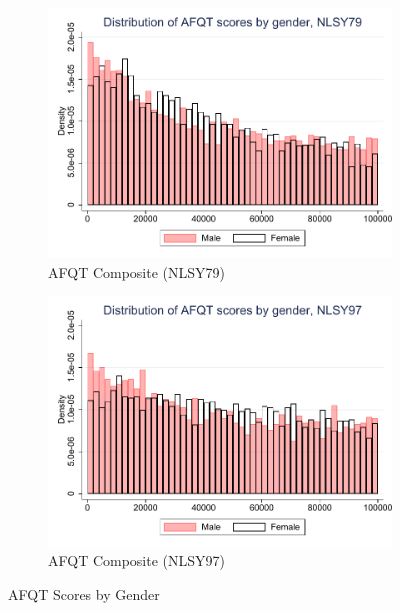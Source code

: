 \documentclass[onehalfspacing,11pt]{article}
\begin{document}
\begin{figure}
	\begin{subfigure}{0.49\textwidth}
		\includegraphics[width=\linewidth]{NLSY79_afqt79_gender.pdf}
		\caption{AFQT Composite (NLSY79)} \label{fig:nlsy79math}
	\end{subfigure}
	\hspace*{\fill} %
	\begin{subfigure}{0.49\textwidth}
		\includegraphics[width=\linewidth]{NLSY97_afqt97_gender.pdf}
		\caption{AFQT Composite (NLSY97)} \label{fig:nlsy79word}
	\end{subfigure}
	\caption{AFQT Scores by Gender}
	\label{fig:nlsy_comp_by_gender}
\end{figure}
	
\end{document}
